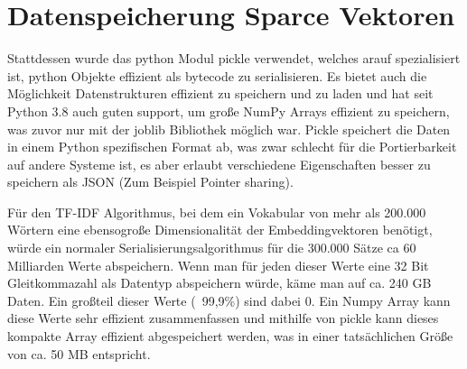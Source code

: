 \section{Datenspeicherung Sparce Vektoren}

Stattdessen wurde das python Modul pickle verwendet, welches arauf spezialisiert ist, python Objekte effizient als bytecode zu serialisieren. 
Es bietet auch die Möglichkeit Datenstrukturen effizient zu speichern und zu laden und hat seit Python 3.8 auch guten support, um große NumPy Arrays effizient zu speichern, was zuvor nur mit der joblib Bibliothek möglich war.
Pickle speichert die Daten in einem Python spezifischen Format ab, was zwar schlecht für die Portierbarkeit auf andere Systeme ist, es aber erlaubt verschiedene Eigenschaften besser zu speichern als JSON (Zum Beispiel Pointer sharing).

Für den TF-IDF Algorithmus, bei dem ein Vokabular von mehr als 200.000 Wörtern eine ebensogroße Dimensionalität der Embeddingvektoren benötigt, würde ein normaler Serialisierungsalgorithmus für die 300.000 Sätze ca 60 Milliarden Werte abspeichern.
Wenn man für jeden dieser Werte eine 32 Bit Gleitkommazahl als Datentyp abspeichern würde, käme man auf ca. 240 GB Daten. 
Ein großteil dieser Werte (~99,9\%) sind dabei 0.
Ein Numpy Array kann diese Werte sehr effizient zusammenfassen und mithilfe von pickle kann dieses kompakte Array effizient abgespeichert werden, was in einer tatsächlichen Größe von ca. 50 MB entspricht.



